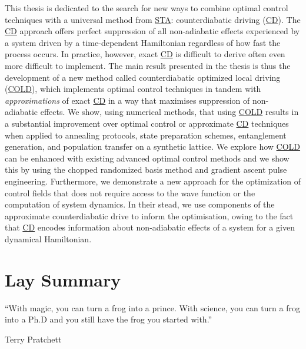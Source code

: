 \documentclass[a4paper,oneside,11pt]{book}
\newcommand{\acrref}[1]{\hyperref[acr:#1]{#1}}
\begin{document}
This thesis is dedicated to the search for new ways to combine optimal control techniques with a universal method from \acrref{STA}: counterdiabatic driving (\acrref{CD}). The \acrref{CD} approach offers perfect suppression of all non-adiabatic effects experienced by a system driven by a time-dependent Hamiltonian regardless of how fast the process occurs. In practice, however, exact \acrref{CD} is difficult to derive often even more difficult to implement. The main result presented in the thesis is thus the development of a new method called counterdiabatic optimized local driving (\acrref{COLD}), which implements optimal control techniques in tandem with \emph{approximations} of exact \acrref{CD} in a way that maximises suppression of non-adiabatic effects. We show, using numerical methods, that using \acrref{COLD} results in a substantial improvement over optimal control or approximate \acrref{CD} techniques when applied to annealing protocols, state preparation schemes, entanglement generation, and population transfer on a synthetic lattice. We explore how \acrref{COLD} can be enhanced with existing advanced optimal control methods and we show this by using the chopped randomized basis method and gradient ascent pulse engineering. Furthermore, we demonstrate a new approach for the optimization of control fields that does not require access to the wave function or the computation of system dynamics. In their stead, we use components of the approximate counterdiabatic drive to inform the optimisation, owing to the fact that \acrref{CD} encodes information about non-adiabatic effects of a system for a given dynamical Hamiltonian. 

\tableofcontents

\chapter{Lay Summary}
\epigraph{“With magic, you can turn a frog into a prince. With science, you can turn a frog into a Ph.D and you still have the frog you started with.”}{Terry Pratchett}
\end{document}
